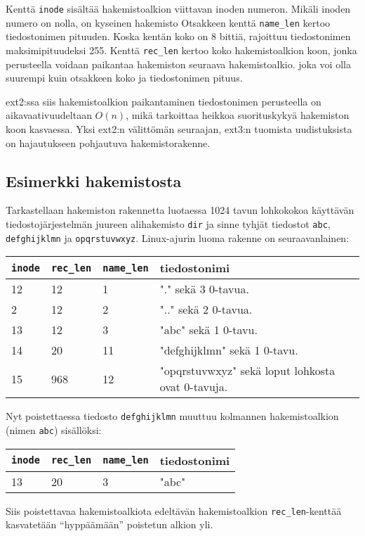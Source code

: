 Kenttä \texttt{inode} sisältää hakemistoalkion viittavan inoden numeron.
Mikäli inoden numero on nolla, on kyseinen hakemisto
Otsakkeen kenttä \texttt{name\_len} kertoo tiedostonimen pituuden.
Koska kentän koko on 8 bittiä, rajoittuu tiedostonimen maksimipituudeksi 255.
Kenttä \texttt{rec\_len} kertoo koko hakemistoalkion koon,
jonka perusteella voidaan paikantaa hakemiston seuraava hakemistoalkio.
joka voi olla suurempi kuin otsakkeen koko ja tiedostonimen pituus.

ext2:ssa siis hakemistoalkion paikantaminen tiedostonimen perusteella on aikavaativuudeltaan $O(n)$,
mikä tarkoittaa heikkoa suorituskykyä hakemiston koon kasvaessa.
Yksi ext2:n välittömän seuraajan, ext3:n tuomista uudistuksista on hajautukseen pohjautuva hakemistorakenne.

\subsection{Esimerkki hakemistosta}
Tarkastellaan hakemiston rakennetta luotaessa 1024 tavun lohkokokoa käyttävän tiedostojärjestelmän juureen alihakemisto \texttt{dir} ja sinne tyhjät tiedostot \texttt{abc}, \texttt{defghijklmn} ja \texttt{opqrstuvwxyz}.
Linux-ajurin luoma rakenne on seuraavanlainen:

\begin{tabular}{llll}
    \texttt{inode} & \texttt{rec\_len} & \texttt{name\_len} & tiedostonimi \\ \hline
    12 & 12  & 1  & "."            sekä 3 0-tavua. \\
    2  & 12  & 2  & ".."           sekä 2 0-tavua. \\
    13 & 12  & 3  & "abc"          sekä 1 0-tavu. \\
    14 & 20  & 11 & "defghijklmn"  sekä 1 0-tavu. \\
    15 & 968 & 12 & "opqrstuvwxyz" sekä loput lohkosta ovat 0-tavuja. \\
\end{tabular}

Nyt poistettaessa tiedosto \texttt{defghijklmn} muuttuu kolmannen hakemistoalkion (nimen \texttt{abc}) sisällöksi:
\begin{tabular}{llll}
    \texttt{inode} & \texttt{rec\_len} & \texttt{name\_len} & tiedostonimi \\ \hline
    13 & 20  & 3  & "abc"\\
\end{tabular}

Siis poistettavaa hakemistoalkiota edeltävän hakemistoalkion \texttt{rec\_len}-kenttää kasvatetään ``hyppäämään'' poistetun alkion yli.

